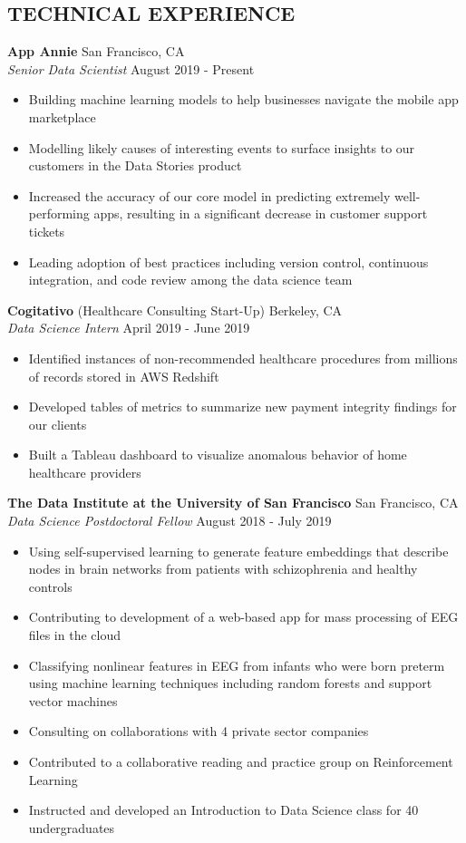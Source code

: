 \documentclass[line,margin,10pt]{res}
\begin{document}
\begin{resume}
\section{TECHNICAL EXPERIENCE}

\textbf{App Annie} \hfill San Francisco, CA \\
{\sl Senior Data Scientist} \hfill August 2019 - Present
\begin{itemize} \itemsep -2pt
\item Building machine learning models to help businesses navigate the mobile app marketplace
\item Modelling likely causes of interesting events to surface insights to our customers in the Data Stories product
\item Increased the accuracy of our core model in predicting extremely well-performing apps, resulting in a significant decrease in customer support tickets
\item Leading adoption of best practices including version control, continuous integration, and code review among the data science team
\end{itemize}

\textbf{Cogitativo} (Healthcare Consulting Start-Up) \hfill Berkeley, CA \\
{\sl Data Science Intern} \hfill April 2019 - June 2019
\begin{itemize} \itemsep -2pt
\item Identified instances of non-recommended healthcare procedures from millions of records stored in AWS Redshift
\item Developed tables of metrics to summarize new payment integrity findings for our clients
\item Built a Tableau dashboard to visualize anomalous behavior of home healthcare providers
\end{itemize}

\textbf{The Data Institute at the University of San Francisco} \hfill San Francisco, CA \\
{\sl Data Science Postdoctoral Fellow} \hfill August 2018 - July 2019
\begin{itemize} \itemsep -2pt
\item Using self-supervised learning to generate feature embeddings that describe nodes in brain networks from patients with schizophrenia and healthy controls
\item Contributing to development of a web-based app for mass processing of EEG files in the cloud
\item Classifying nonlinear features in EEG from infants who were born preterm using machine learning techniques including random forests and support vector machines
\item Consulting on collaborations with 4 private sector companies
\item Contributed to a collaborative reading and practice group on Reinforcement Learning
\item Instructed and developed an Introduction to Data Science class for 40 undergraduates
\end{itemize}



\end{resume}
\end{document}
